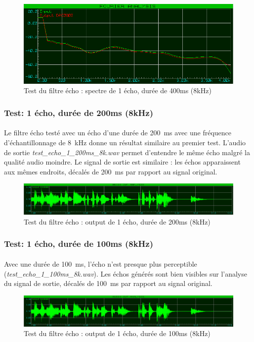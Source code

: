 \documentclass{article}
\begin{document}
    \begin{figure}[H]
        \centering
        \includegraphics[width=.6\textwidth]{./images/spectrum_echo_1_400ms_8k.png}
        \caption{Test du filtre écho : spectre de 1 écho, durée de 400ms (8kHz)}
    \end{figure}

    \subsubsection{Test: 1 écho, durée de 200ms (8kHz)}
    \paragraph{}
    Le filtre écho testé avec un écho d'une durée de \SI{200}{\milli\second} avec une fréquence d'échantillonnage de \SI{8}{\kilo\hertz} donne un résultat similaire au premier test. L'audio de sortie \emph{test\_echo\_1\_200ms\_8k.wav} permet d'entendre le même écho malgré la qualité audio moindre. Le signal de sortie est similaire : les échos apparaissent aux mêmes endroits, décalés de \SI{200}{\milli\second} par rapport au signal original.
    \begin{figure}[H]
        \centering
        \includegraphics[width=\textwidth]{./images/out_echo_1_200ms_8k.png}
        \caption{Test du filtre écho : output de 1 écho, durée de 200ms (8kHz)}
    \end{figure}

    \subsubsection{Test: 1 écho, durée de 100ms (8kHz)}
    \paragraph{}
    Avec une durée de \SI{100}{\milli\second}, l'écho n'est presque plus perceptible (\emph{test\_echo\_1\_100ms\_8k.wav}). Les échos générés sont bien visibles sur l'analyse du signal de sortie, décalés de \SI{100}{\milli\second} par rapport au signal original.
    \begin{figure}[H]
        \centering
        \includegraphics[width=\textwidth]{./images/out_echo_1_100ms_8k.png}
        \caption{Test du filtre écho : output de 1 écho, durée de 100ms (8kHz)}
    \end{figure}
\end{document}
